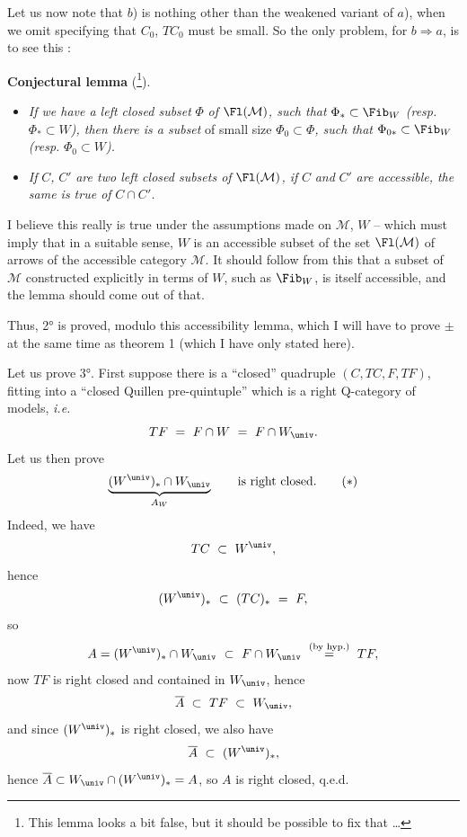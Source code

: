 Let us now note that $b$) is nothing other than the weakened variant of $a$), when we omit specifying that $C_0$, $TC_0$ must be small. So the only problem, for $b \Longrightarrow a$, is to see this :

\textbf{Conjectural lemma} (\footnote[15]{This lemma looks a bit false, but it should be possible to fix that \dots}).

\begin{itemize}[leftmargin=2.5em]
\item[\circled{1}] \textit{If we have a left closed subset} $\Phi$ \textit{of} $\Fl(\mathcal{M})$\textit{, such that} $\Phi_* \subset \Fib_W$ \textit{(resp.} $\Phi_* \subset W$\textit{), then there is a subset} of small size $\Phi_0 \subset \Phi$\textit{, such that} $\Phi_{0*} \subset \Fib_W$ \textit{(resp.} $\Phi_0 \subset W$\textit{).}

\item[\circled{2}] \textit{If} $C$\textit{,} $C'$ \textit{are two left closed subsets of} $\Fl(\mathcal{M})$\textit{, if} $C$ \textit{and} $C'$ \textit{are accessible, the same is true of} $C \cap C'$\textit{.}
\end{itemize}

I believe this really is true under the assumptions made on $\mathcal{M}$, $W$ -- which must imply that in a suitable sense, $W$ is an accessible subset of the set $\Fl(\mathcal{M})$ of arrows of the accessible category $\mathcal{M}$. It should follow from this that a subset of $\mathcal{M}$ constructed explicitly in terms of $W$, such as $\Fib_W$, is itself accessible, and the lemma should come out of that.

Thus, 2° is proved, modulo this accessibility lemma, which I will have to prove $\pm$ at the same time as theorem 1 (which I have only stated here).


Let us prove 3°. First suppose there is a ``closed'' quadruple $(C, TC, F, TF)$, fitting into a ``closed Quillen pre-quintuple'' which is a right Q-category of models, \textit{i.e.}
\[ TF \ =\ F \cap W \ =\ F \cap W_{\univ}. \]
Let us then prove 
\[ \underbrace{(W^{\univ})_* \cap W_{\univ}}_{A_W} \qquad \text{is right closed.} \tag*{$(*)$} \]
Indeed, we have
\[ TC \ \subset\ W^{\univ}, \]
hence
\[ (W^{\univ})_* \ \subset\ (TC)_* \ =\ F, \]
so
\[ A = (W^{\univ})_* \cap W_{\univ} \ \subset\ F \cap W_{\univ} \ \overset{\text{(by hyp.)}}{=}\ TF, \]
now $TF$ is right closed and contained in $W_{\univ}$, hence
\[ \overline{A} \ \subset\ TF \ \subset\ W_{\univ}, \]
and since $(W^{\univ})_*$ is right closed, we also have
\[ \overline{A} \ \subset\ (W^{\univ})_*, \]
hence $\overline{A} \subset W_{\univ} \cap (W^{\univ})_* = A$, so $A$ is right closed, q.e.d.

